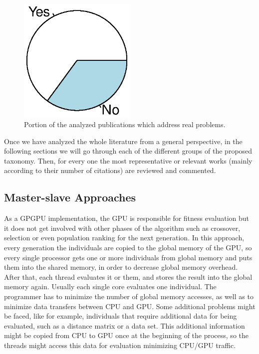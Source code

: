 \documentclass{article}
\begin{document}
\begin{figure}[!ht]
\centering
\includegraphics[clip,trim=16 64 16 64,width=0.5\textwidth]{realproblem.eps}
\caption{Portion of the analyzed publications which address real problems.}
\label{figure:type_problem}
\end{figure}


Once we have analyzed the whole literature from a general perspective, in the following sections we will go through each of the different groups of the proposed taxonomy. Then, for every one the most representative or relevant works (mainly according to their number of citations) are reviewed and commented.


\subsection{Master-slave Approaches}
\label{sec:masterSlave}

As a GPGPU implementation, the GPU is responsible for fitness
evaluation but it does not get involved with other phases of the
algorithm such as crossover, selection or even population ranking for
the next generation. In this approach, every generation the
individuals are copied to the global memory of the GPU, so every
single processor gets one or more individuals from global memory and
puts them into the shared memory, in order to decrease global memory
overhead. After that, each thread evaluates it or them, and stores the
result into the global memory again. Usually each single core
evaluates one individual. The programmer has to minimize the number of
global memory accesses, as well as to minimize data transfers between
CPU and GPU. Some additional problems might be faced, like for
example, individuals that require additional data for being evaluated,
such as a distance matrix or a data set. This additional information
might be copied from CPU to GPU once at the beginning of the process,
so the threads might access this data for evaluation minimizing CPU/GPU 
traffic.
\end{document}
